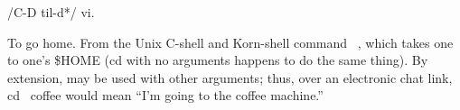  /C-D til-d*/ vi.

To go home. From the Unix C-shell and Korn-shell command ~, which takes one to
one's \$HOME (cd with no arguments happens to do the same thing). By extension,
may be used with other arguments; thus, over an electronic chat link, cd ~coffee
would mean ``I'm going to the coffee machine.''

